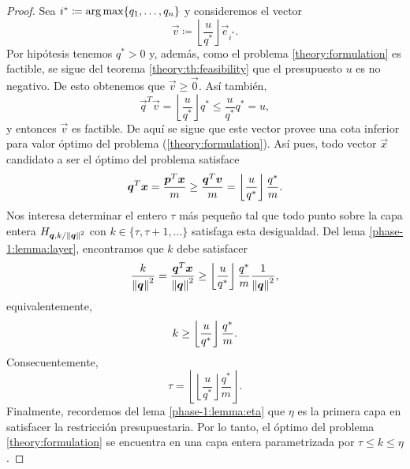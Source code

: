 \begin{proof}
	Sea $i^* \coloneq \operatorname{arg\,max}\lbrace q_1, \ldots, q_n \rbrace$ y consideremos el vector
	\begin{equation*}
		\vec{v} \coloneq \left\lfloor \frac{u}{q^*} \right\rfloor \vec{e}_{i^*}.
	\end{equation*}
	Por hipótesis tenemos $q^* > 0$ y, además, como el problema
	\eqref{theory:formulation} es factible, se sigue del teorema \ref{theory:th:feasibility} que el
	presupuesto $u$ es no negativo. De esto obtenemos que $\vec{v} \geq \vec{0}$. Así también,
	\begin{equation*}
		\vec{q}^T\vec{v} = \left\lfloor \frac{u}{q^*} \right\rfloor q^*
		\leq \frac{u}{q^*}q^* = u,
	\end{equation*}
	y entonces $\vec{v}$ es factible. De aquí se sigue que este vector provee
	una cota inferior para valor óptimo del problema
	(\ref{theory:formulation}). Así pues, todo vector $\vec{x}$ candidato a ser
	el óptimo del problema satisface
	\begin{equation*}
		\boldsymbol{q}^T\boldsymbol{x} = \frac{\boldsymbol{p}^T\boldsymbol{x}}{m} \geq \frac{\boldsymbol{q}^T\boldsymbol{v}}{m} = 
		\left\lfloor \frac{u}{q^*} \right\rfloor \frac{q^*}{m}.
	\end{equation*}
	Nos interesa determinar el entero $\tau$ más pequeño tal que todo punto sobre la capa
	entera $H_{\boldsymbol{\boldsymbol{q}}, k/\left\lVert \boldsymbol{\boldsymbol{q}} \right\rVert^{2}}$ con $k \in \lbrace \tau, \tau + 1, \ldots \rbrace$
	satisfaga esta desigualdad. Del lema \ref{phase-1:lemma:layer}, encontramos que $k$ debe satisfacer
	\begin{equation*}
		\frac{k}{\left\lVert \boldsymbol{q} \right\rVert^{2}} = \frac{\boldsymbol{q}^T\boldsymbol{x}}{\left\lVert \boldsymbol{q} \right\rVert^2} \geq
		\left\lfloor \frac{u}{q^*} \right\rfloor \frac{q^*}{m}
		\frac{1}{\left\lVert \boldsymbol{q} \right\rVert^2},
	\end{equation*}
	equivalentemente,
	\begin{equation*}
		k \geq \left\lfloor \frac{u}{q^*} \right\rfloor\frac{q^*}{m}.
	\end{equation*}
	Consecuentemente,
	\begin{equation*}
		\tau =
		\left\lfloor \left\lfloor \frac{u}{q^*} \right\rfloor \frac{q^*}{m}
			\right\rfloor.
	\end{equation*}
	Finalmente, recordemos del lema \ref{phase-1:lemma:eta} que $\eta$ es la primera capa en
	satisfacer la restricción presupuestaria. Por lo tanto, el óptimo del problema
	\eqref{theory:formulation} se encuentra en una capa entera parametrizada por $\tau \leq k \leq \eta$.
\end{proof}

